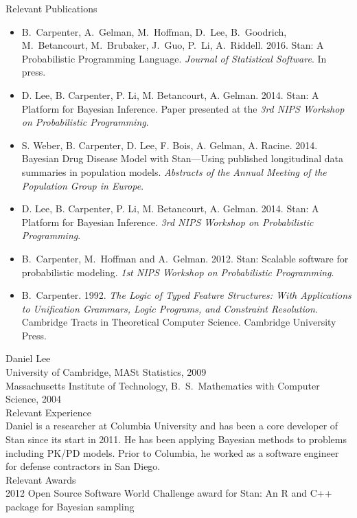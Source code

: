 \documentclass[11pt]{nih2016}
\begin{document}
\noindent
{\sc Relevant Publications}
\vspace*{-3pt}
\begin{itemize}
\item B.\ Carpenter, A.\ Gelman, M.\ Hoffman, D.\ Lee, B.\ Goodrich,
  M.\ Betancourt, M.\ Brubaker, J.\ Guo, P.\ Li, A.\ Riddell. 2016.
  Stan: A Probabilistic Programming Language. {\it Journal of
    Statistical Software}.  In press.
\item D. Lee, B. Carpenter, P. Li, M. Betancourt, A. Gelman. 2014. Stan: A
  Platform for Bayesian Inference.  Paper presented at the {\it 3rd
    NIPS Workshop on Probabilistic Programming}.
\item S. Weber, B. Carpenter, D. Lee, F. Bois, A. Gelman,
  A. Racine. 2014. Bayesian Drug Disease Model with Stan---Using published
  longitudinal data summaries in population models. {\it
    Abstracts of the Annual Meeting of the Population Group in
    Europe}.
\item D. Lee, B. Carpenter, P. Li, M. Betancourt, A. Gelman. 2014. Stan: A
  Platform for Bayesian Inference. {\it 3rd NIPS Workshop on
    Probabilistic Programming}.
\item B.~Carpenter, M.~Hoffman and A.~Gelman. 2012. Stan: Scalable
  software for probabilistic modeling.  {\it 1st NIPS Workshop on
    Probabilistic Programming}.
\item B.~Carpenter. 1992.  {\it The Logic of Typed Feature Structures:
    With Applications to Unification Grammars, Logic Programs, and
    Constraint Resolution}.  Cambridge Tracts in Theoretical Computer
  Science. Cambridge University Press.
\end{itemize}

\noindent
{\sc Daniel Lee}
\\[2pt]
University of Cambridge, MASt Statistics, 2009
\\
Massachusetts Institute of Technology, B.~S.\ Mathematics with Computer Science, 2004
\\

\noindent
{\sc Relevant Experience}
\\[2pt]
Daniel is a researcher at Columbia University and has been a core
developer of Stan since its start in 2011. He has been applying
Bayesian methods to problems including PK/PD models. Prior to Columbia,
he worked as a software engineer for defense contractors in San Diego.
\\

\noindent
{\sc Relevant Awards}
\\[2pt]
2012 Open Source Software World Challenge award
for Stan: An R and C++ package for Bayesian sampling \\
\end{document}
